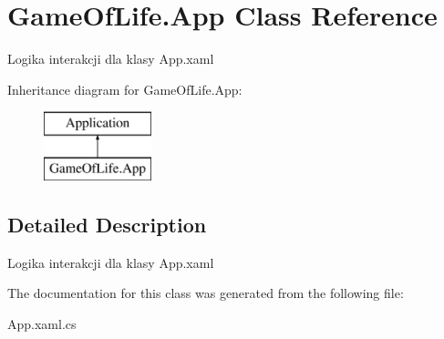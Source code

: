 \hypertarget{class_game_of_life_1_1_app}{}\section{Game\+Of\+Life.\+App Class Reference}
\label{class_game_of_life_1_1_app}


Logika interakcji dla klasy App.\+xaml  


Inheritance diagram for Game\+Of\+Life.\+App\+:\begin{figure}[H]
\begin{center}
\leavevmode
\includegraphics[height=2.000000cm]{class_game_of_life_1_1_app}
\end{center}
\end{figure}


\subsection{Detailed Description}
Logika interakcji dla klasy App.\+xaml 



The documentation for this class was generated from the following file\+:\begin{DoxyCompactItemize}
\item 
App.\+xaml.\+cs\end{DoxyCompactItemize}

